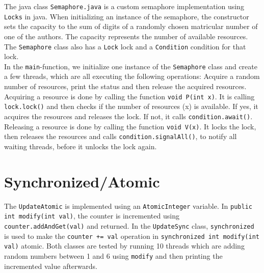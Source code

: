 \documentclass{article}
\begin{document}
    The java class \texttt{Semaphore.java} is a custom semaphore implementation using \texttt{Locks} in java. When initializing an instance of the semaphore, the constructor sets the capacity to the sum of digits of a randomly chosen matricular number of one of the authors. The capacity represents the number of available resources. The \texttt{Semaphore} class also has a \texttt{Lock} lock and a \texttt{Condition} condition for that lock.\\
    In the \texttt{main}-function, we initialize one instance of the \texttt{Semaphore} class and create a few threads, which are all executing the following operations: Acquire a random number of resources, print the status and then release the acquired resources.\\
    Acquiring a resource is done by calling the function \texttt{void P(int x)}. It is calling \texttt{lock.lock()} and then checks if the number of resources (x) is available. If yes, it acquires the resources and releases the lock. If not, it calls \texttt{condition.await()}. Releasing a resource is done by calling the function \texttt{void V(x)}. It locks the lock, then releases the resources and calls \texttt{condition.signalAll()}, to notify all waiting threads, before it unlocks the lock again.

  \section{Synchronized/Atomic}

    The \texttt{UpdateAtomic} is implemented using an \texttt{AtomicInteger} variable. In \texttt{public int modify(int val)}, the counter is incremented using \texttt{counter.addAndGet(val)} and returned. In the \texttt{UpdateSync} class, \texttt{synchronized} is used to make the \texttt{counter += val} operation in \texttt{synchronized int modify(int val)} atomic. Both classes are tested by running 10 threads which are adding random numbers between 1 and 6 using \texttt{modify} and then printing the incremented value afterwards.
\end{document}
